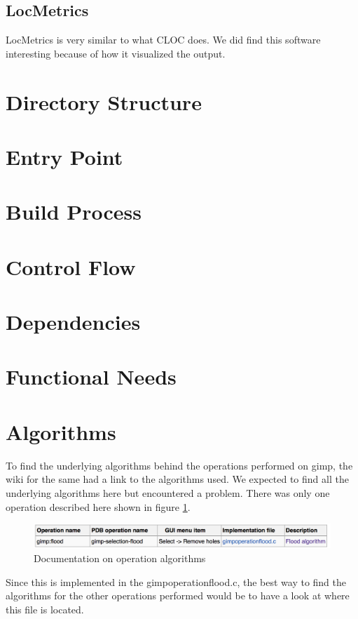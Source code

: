 \subsection{LocMetrics}
LocMetrics\cite{locmetrics} is very similar to what CLOC does. We did find this software interesting because of how it visualized the output.

\section{Directory Structure}
\section{Entry Point}
\section{Build Process}
\section{Control Flow}
\section{Dependencies}
\section{Functional Needs}
\section{Algorithms}
To find the underlying algorithms behind the operations performed on gimp, the wiki for the same had a link to the algorithms used. We expected to find all the underlying algorithms here but encountered a problem. There was only one operation described here shown in figure \ref{fig:algorithm}.

\begin{figure}
\centering
\includegraphics[width=1\textwidth]{algorithm.png}
\caption{\label{fig:algorithm}Documentation on operation algorithms}
\end{figure}

Since this is implemented in the gimpoperationflood.c, the best way to find the algorithms for the other operations performed would be to have a look at where this file is located.
 
